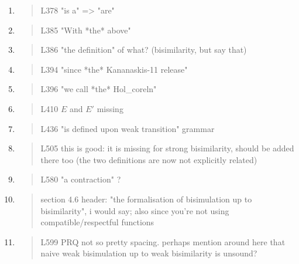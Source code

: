 \begin{enumerate}
\item \begin{quote}
    L378 "is a" => "are"
  \end{quote}

\item \begin{quote}
    L385 "With *the* above"
  \end{quote}

\item \begin{quote}
    L386 "the definition" of what? (bisimilarity, but say that)
  \end{quote}

\item \begin{quote}
    L394 "since *the* Kananaskis-11 release"
  \end{quote}

\item \begin{quote}
    L396 "we call *the* Hol_coreln"
  \end{quote}

\item \begin{quote}
    L410 $E$ and $E'$ missing
  \end{quote}

\item \begin{quote}
    L436 "is defined upon weak transition" grammar
  \end{quote}

\item \begin{quote}
    L505 this is good: it is missing for strong bisimilarity, should
    be added there too (the two definitions are now not explicitly
    related)
  \end{quote}

\item \begin{quote}
    L580 "a contraction" ?
  \end{quote}

\item \begin{quote}
    section 4.6 header: "the formalisation of bisimulation up to
    bisimilarity", i would say; also since you're not using
    compatible/respectful functions
  \end{quote}

\item \begin{quote}
    L599 PRQ not so pretty spacing. perhaps mention around here that
    naive weak bisimulation up to weak bisimilarity is unsound?
  \end{quote}


\end{enumerate}
